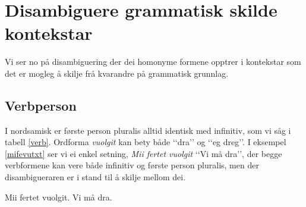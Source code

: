 \documentclass[a4paper,norsk]{article}
\begin{document}
% 
% 
% 


\section{Disambiguere grammatisk skilde kontekstar}



Vi ser no på disambiguering der dei homonyme formene opptrer i kontekstar som det er mogleg å skilje frå kvarandre på grammatisk grunnlag. %

\subsection{Verbperson}

I nordsamisk er første person pluralis alltid identisk med infinitiv, som vi såg i tabell \ref{verb}. Ordforma \textit{vuolgit} kan bety både ‘‘dra’’ og ‘‘eg dreg’’. I eksempel \ref{mifevutxt} ser vi ei enkel setning, \textit{Mii fertet vuolgit} ‘‘Vi må dra’’,  der begge verbformene kan vere både infinitiv og første person pluralis, men der disambigueraren er i stand til å skilje mellom dei. %

\begin{example}\label{mifevutxt}
\gll Mii fertet vuolgit.
 Vi må dra.
\gln 
\glend
\end{example}
\end{document}
